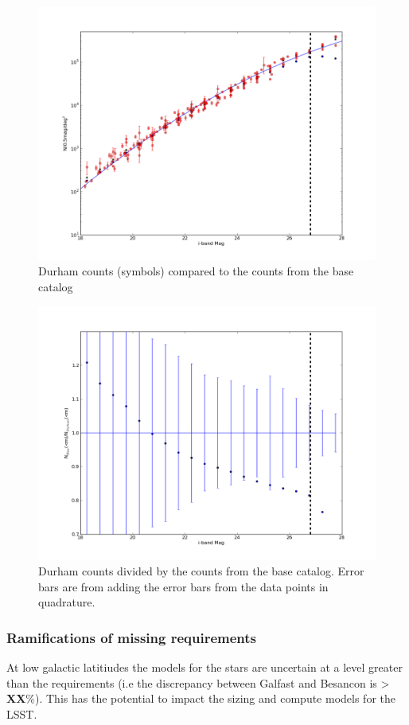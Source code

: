 \documentclass[]{article}
\begin{document}
{\begin{figure}[H]
\centering
\includegraphics[width=5in]{validation_figures/Ngals-i.png}
\caption{Durham counts (symbols) compared to the counts from the base catalog \label{fig:gcounts}}
\end{figure}
\begin{figure}[H]
\centering
\includegraphics[width=5in]{validation_figures/CumulativeFraction_i.png}
\caption{Durham counts divided by the counts from the base catalog.  Error bars are from adding the error bars from the data points in quadrature. \label{fig:gratio}}
\end{figure}

\subsubsection{Ramifications of missing requirements}
At low galactic latitiudes the models for the stars are uncertain at a level greater than the requirements (i.e the discrepancy between Galfast and Besancon is > {\bf XX}\%).  This has the potential to impact the sizing and compute models for the LSST.

}
\end{document}
